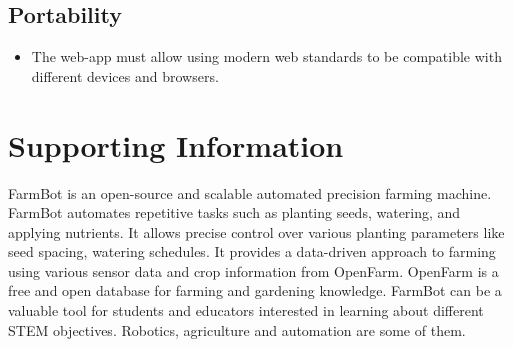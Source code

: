 \subsection{Portability}
\begin{itemize}
    \item The web-app must allow using modern web standards to be compatible with different devices and browsers.
\end{itemize}

\section{Supporting Information}

FarmBot is an open-source and scalable automated precision farming machine. FarmBot automates repetitive tasks such as planting seeds, watering, and applying nutrients. It allows precise control over various planting parameters like seed spacing, watering schedules. It provides a data-driven approach to farming using various sensor data and crop information from OpenFarm. OpenFarm is a free and open database for farming and gardening knowledge. FarmBot can be a valuable tool for students and educators interested in learning about different STEM objectives. Robotics, agriculture and automation are some of them. 


